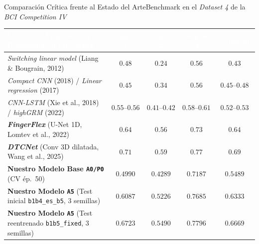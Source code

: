 \begin{frame}{Comparaci\'on Cr\'itica frente al Estado del Arte}{Benchmark en el \textit{Dataset 4} de la \textit{BCI Competition IV} \cite{liang2012decoding,Xie2018,Lomtev2022,wang2025dtcnet,rodas_valencia_tpe_ecog}}
  \scriptsize
  \centering
  \renewcommand{\arraystretch}{1.20}
  \setlength{\tabcolsep}{5pt}
  \begin{tabularx}{\textwidth}{@{} >{\raggedright\arraybackslash}X c c c c @{}}
    \toprule
    \rowcolor{ipnDark}
    \textcolor{white}{\textbf{M\'etodo / Arquitectura Reportada en Literatura}} &
    \textcolor{white}{\textbf{Sujeto 1}} &
    \textcolor{white}{\textbf{Sujeto 2}} &
    \textcolor{white}{\textbf{Sujeto 3}} &
    \textcolor{white}{\textbf{Promedio}} \\
    \midrule
    \textit{Switching linear model} (Liang \& Bougrain, 2012) \cite{liang2012decoding} & $0.48$ & $0.24$ & $0.56$ & $0.43$ \\
    \rowcolor{rowLight}
    \textit{Compact CNN} (2018) / \textit{Linear regression} (2017) & $0.45$ & $0.34$ & $0.56$ & $0.45\text{--}0.48$ \\
    \textit{CNN-LSTM} (Xie et al., 2018) \cite{Xie2018} / \textit{highGRM} (2022) & $0.55\text{--}0.56$ & $0.41\text{--}0.42$ & $0.58\text{--}0.61$ & $0.52\text{--}0.53$ \\
    \midrule
    \textbf{\textit{FingerFlex}} (U-Net 1D, Lomtev et al., 2022) \cite{Lomtev2022} & $0.64$ & $0.56$ & $0.73$ & $\mathbf{0.64}$ \\
    \rowcolor{rowLight}
    \textbf{\textit{DTCNet}} (Conv 3D dilatada, Wang et al., 2025) \cite{wang2025dtcnet} & $0.71$ & $0.59$ & $0.77$ & $\mathbf{0.69}$ \\
    \midrule
    \textbf{Nuestro Modelo Base \texttt{A0/P0}} (CV \'ep.\ 50) & $0.4990$ & $0.4289$ & $0.7187$ & $0.5489$ \\
    \rowcolor{rowLight}
    \textbf{Nuestro Modelo \texttt{A5}} (Test inicial \texttt{b1b4\_es\_b5}, 3 semillas) & $0.6087$ & $0.5226$ & $0.7685$ & $\mathbf{0.6333}$ \\
    \rowcolor{rowHighlight}
    \textbf{Nuestro Modelo \texttt{A5}} (Test reentrenado \texttt{b1b5\_fixed}, 3 semillas) & $\mathbf{0.6723}$ & $\mathbf{0.5490}$ & $\mathbf{0.7796}$ & $\mathbf{0.6669}$ \\
    \bottomrule
  \end{tabularx}


\end{frame}
